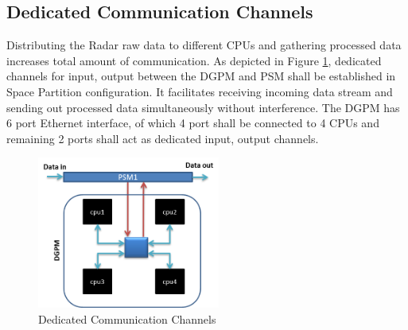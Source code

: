\subsection{Dedicated Communication Channels}
Distributing the Radar raw data to different CPUs and gathering processed data increases total amount of communication. As depicted in Figure \ref{fig:mm:dedicated_channels}, dedicated channels for input, output between the DGPM and PSM shall be established in Space Partition configuration. It facilitates receiving incoming data stream and sending out processed data simultaneously without interference. The DGPM has 6 port Ethernet interface, of which 4 port shall be connected to 4 CPUs and remaining 2 ports shall act as dedicated input, output channels.

\begin{figure}[h!]
	\centering
	\includegraphics[width=60mm]{figures/dedicated_channels}
	\caption{Dedicated Communication Channels}
	\label{fig:mm:dedicated_channels}
\end{figure}

